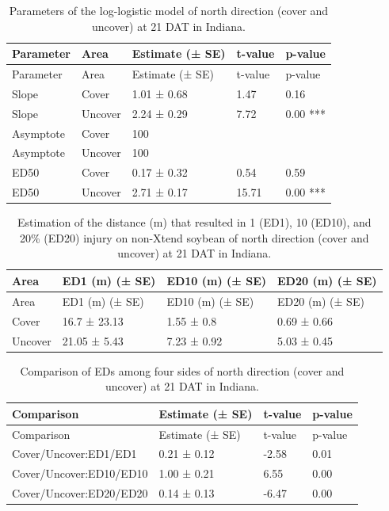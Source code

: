 \documentclass[]{article}
\begin{document}
\begin{longtable}[]{@{}lllll@{}}
\caption{Parameters of the log-logistic model of north direction (cover
and uncover) at 21 DAT in Indiana.}\tabularnewline
\toprule
Parameter & Area & Estimate (± SE) & t-value & p-value\tabularnewline
\midrule
\endfirsthead
\toprule
Parameter & Area & Estimate (± SE) & t-value & p-value\tabularnewline
\midrule
\endhead
Slope & Cover & 1.01 ± 0.68 & 1.47 & 0.16\tabularnewline
Slope & Uncover & 2.24 ± 0.29 & 7.72 & 0.00 ***\tabularnewline
Asymptote & Cover & 100 & &\tabularnewline
Asymptote & Uncover & 100 & &\tabularnewline
ED50 & Cover & 0.17 ± 0.32 & 0.54 & 0.59\tabularnewline
ED50 & Uncover & 2.71 ± 0.17 & 15.71 & 0.00 ***\tabularnewline
\bottomrule
\end{longtable}

\begin{longtable}[]{@{}llll@{}}
\caption{Estimation of the distance (m) that resulted in 1 (ED1), 10
(ED10), and 20\% (ED20) injury on non-Xtend soybean of north direction
(cover and uncover) at 21 DAT in Indiana.}\tabularnewline
\toprule
Area & ED1 (m) (± SE) & ED10 (m) (± SE) & ED20 (m) (± SE)\tabularnewline
\midrule
\endfirsthead
\toprule
Area & ED1 (m) (± SE) & ED10 (m) (± SE) & ED20 (m) (± SE)\tabularnewline
\midrule
\endhead
Cover & 16.7 ± 23.13 & 1.55 ± 0.8 & 0.69 ± 0.66\tabularnewline
Uncover & 21.05 ± 5.43 & 7.23 ± 0.92 & 5.03 ± 0.45\tabularnewline
\bottomrule
\end{longtable}

\begin{longtable}[]{@{}llll@{}}
\caption{Comparison of EDs among four sides of north direction (cover
and uncover) at 21 DAT in Indiana.}\tabularnewline
\toprule
Comparison & Estimate (± SE) & t-value & p-value\tabularnewline
\midrule
\endfirsthead
\toprule
Comparison & Estimate (± SE) & t-value & p-value\tabularnewline
\midrule
\endhead
Cover/Uncover:ED1/ED1 & 0.21 ± 0.12 & -2.58 & 0.01\tabularnewline
Cover/Uncover:ED10/ED10 & 1.00 ± 0.21 & 6.55 & 0.00\tabularnewline
Cover/Uncover:ED20/ED20 & 0.14 ± 0.13 & -6.47 & 0.00\tabularnewline
\bottomrule
\end{longtable}
\end{document}
